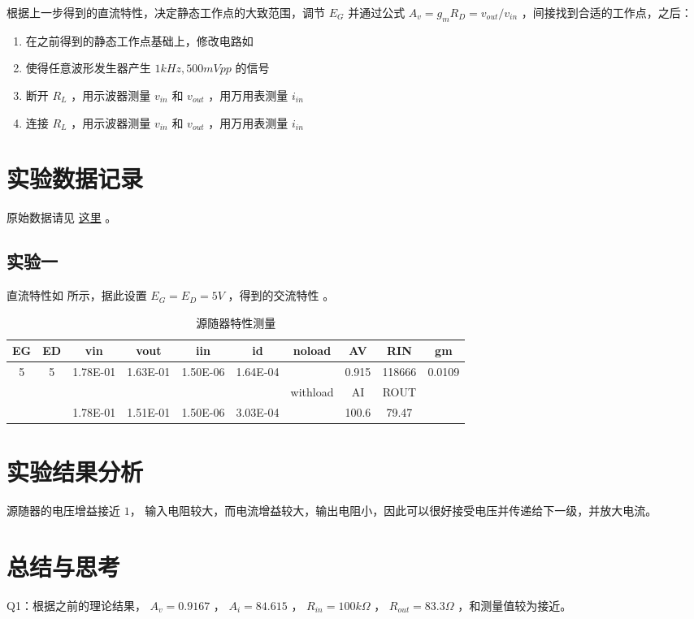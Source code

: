 \documentclass[lang=cn,11pt,a4paper,cite=authoryear]{elegantpaper}
\begin{document}
根据上一步得到的直流特性，决定静态工作点的大致范围，调节 \(E_G\) 并通过公式 \(A_v = g_m R_D = v_{out} / v_{in}\) ，间接找到合适的工作点，之后：

\begin{enumerate}
    \item 在之前得到的静态工作点基础上，修改电路如  
    \item 使得任意波形发生器产生 \(1 kHz, 500 mVpp \) 的信号 
    \item 断开 \(R_L\) ，用示波器测量 \(v_{in}\) 和 \(v_{out}\) ，用万用表测量 \(i_{in}\)
    \item 连接 \(R_L\) ，用示波器测量 \(v_{in}\) 和 \(v_{out}\) ，用万用表测量 \(i_{in}\) 
\end{enumerate}


\section{实验数据记录}

原始数据请见 \href{https://github.com/PannenetsF/Mirco-Electronic-Device-Experiment/tree/main/homework/hw13}{这里} 。

\subsection{实验一}


直流特性如  所示，据此设置 \(E_G = E_D = 5 V\) ，得到的交流特性  。

\begin{table}[htb]
    \centering
    \caption{源随器特性测量}
    \label{t1}
    \begin{tabular}{|c|c|c|c|c|c|c|c|c|c|}
    \hline
    EG & ED & vin      & vout     & iin      & id       & noload   & AV          & RIN         & gm          \\ \hline
    5  & 5  & 1.78E-01 & 1.63E-01 & 1.50E-06 & 1.64E-04 &          & 0.915 & 118666 & 0.0109 \\ \hline
       &    &          &          &          &          & withload & AI          & ROUT        &             \\ \hline
       &    & 1.78E-01 & 1.51E-01 & 1.50E-06 & 3.03E-04 &          & 100.6 & 79.47 &             \\ \hline
    \end{tabular}
\end{table}

\section{实验结果分析}

源随器的电压增益接近 \(1\)， 输入电阻较大，而电流增益较大，输出电阻小，因此可以很好接受电压并传递给下一级，并放大电流。

\section{总结与思考}

Q1：根据之前的理论结果， \(A_v = 0.9167\) ， \(A_i = 84.615\) ， \(R_{in} = 100 k \Omega\) ， \(R_{out} = 83.3 \Omega\) ，和测量值较为接近。


\end{document}
